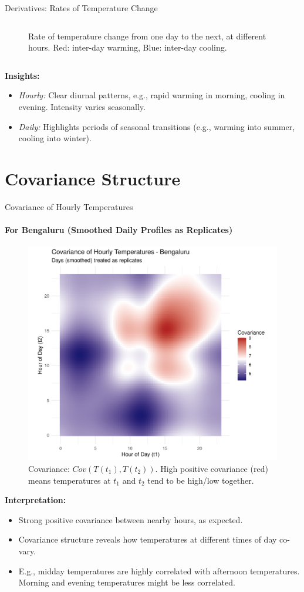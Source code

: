 \documentclass[svgnames, 12pt]{beamer}
\begin{document}
\begin{frame}{Derivatives: Rates of Temperature Change}
\begin{columns}[T]
\begin{column}{0.5\textwidth}
\begin{figure}
        \caption*{Rate of temperature change from one day to the next, at different hours. Red: inter-day warming, Blue: inter-day cooling.}
      \end{figure}
    \end{column}
  \end{columns}
  \vspace{0.5em} %
  \textbf{Insights:}
  \begin{itemize}
    \item \textit{Hourly:} Clear diurnal patterns, e.g., rapid warming in morning, cooling in evening. Intensity varies seasonally.
    \item \textit{Daily:} Highlights periods of seasonal transitions (e.g., warming into summer, cooling into winter).
  \end{itemize}
\end{frame}

\section{Covariance Structure}
\begin{frame}{Covariance of Hourly Temperatures}
  \framesubtitle{For Bengaluru (Smoothed Daily Profiles as Replicates)}
  \begin{figure}
    \includegraphics[width=0.7\linewidth]{../data/output/figures/covariance_heatmap_hourly_city_avg.png}
    \caption{Covariance: $Cov(T(t_1), T(t_2))$. High positive covariance (red) means temperatures at $t_1$ and $t_2$ tend to be high/low together.}
  \end{figure}
  \textbf{Interpretation:}
  \begin{itemize}
    \item Strong positive covariance between nearby hours, as expected.
    \item Covariance structure reveals how temperatures at different times of day co-vary.
    \item E.g., midday temperatures are highly correlated with afternoon temperatures. Morning and evening temperatures might be less correlated.
  \end{itemize}
\end{frame}
\end{document}

